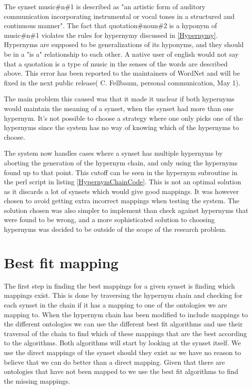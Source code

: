 The synset music\#n\#1 is described as "an artistic form of auditory communication incorporating instrumental or vocal tones in a structured and continuous manner".
The fact that quotation\#noun\#2 is a hyponym of music\#n\#1 violates the rules for hypernymy discussed in \ref{Hypernymy}.
Hypernyms are supposed to be generalizations of its hyponyms,
and they should be in a "is a" relationship to each other.
A native user of english would not say that a quotation is a type of music in the senses of the words are described above.
This error has been reported to the maintainers of WordNet and will be fixed in the next public release( C. Fellbaum, personal communication, May 1).

The main problem this caused was that it made it unclear if both hypernyms would maintain the meaning of a synset,
when the synset had more than one hypernym.
It's not possible to choose a strategy where one only picks one of the hypernyms since the system has no way of
knowing which of the hypernyms to choose.

The system now handles cases where a synset has multiple hypernyms by aborting the generation of the hypernym chain,
and only using the hypernyms found up to that point.
This cutoff can be seen in the hypernym subroutine in the perl script in listing \ref{HypernymChainCode}.
This is not an optimal solution as it discards a lot of synsets which would give good mappings.
It was however chosen to avoid getting extra incorrect mappings when testing the system.
The solution chosen was also simpler to implement than check against hypernyms that were found to be wrong,
and a more sophisticated solution to choosing hypernyms was decided to be outside of the scope of the research problem.

\section{Best fit mapping}
\label{BestFitMapping}
The first step in finding the best mappings for a given synset is finding which mappings exist.
This is done by traversing the hypernym chain and checking for each synset in the chain if it has a mapping to
one of the ontologies we are mapping to.
When the hypernym chain has been modified to include mappings to the different ontologies we can use the different
best fit algorithms and use their traversal of the chain to find which of these mappings that are the best according to
the algorithms.
Both algorithms will start by looking at the synset itself.
We use the direct mappings of the synset should they exist as we have no reason to believe that we can do better than a
direct mapping.
Given that there are ontologies that have not been mapped to we use the best fit algorithms to find the missing mappings.

